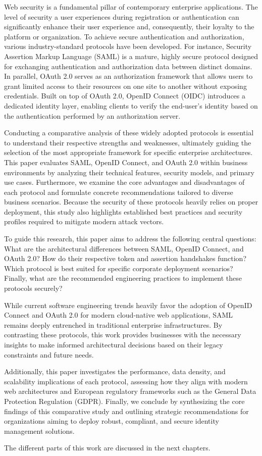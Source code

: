 \documentclass[../memoire.tex]{subfiles}
\begin{document}
Web security is a fundamental pillar of contemporary enterprise applications. The level of security a user experiences during registration or authentication can significantly enhance their user experience and, consequently, their loyalty to the platform or organization. To achieve secure authentication and authorization, various industry-standard protocols have been developed. For instance, Security Assertion Markup Language (SAML) is a mature, highly secure protocol designed for exchanging authentication and authorization data between distinct domains. In parallel, OAuth 2.0 serves as an authorization framework that allows users to grant limited access to their resources on one site to another without exposing credentials. Built on top of OAuth 2.0, OpenID Connect (OIDC) introduces a dedicated identity layer, enabling clients to verify the end-user's identity based on the authentication performed by an authorization server.

Conducting a comparative analysis of these widely adopted protocols is essential to understand their respective strengths and weaknesses, ultimately guiding the selection of the most appropriate framework for specific enterprise architectures. This paper evaluates SAML, OpenID Connect, and OAuth 2.0 within business environments by analyzing their technical features, security models, and primary use cases. Furthermore, we examine the core advantages and disadvantages of each protocol and formulate concrete recommendations tailored to diverse business scenarios. Because the security of these protocols heavily relies on proper deployment, this study also highlights established best practices and security profiles required to mitigate modern attack vectors.

To guide this research, this paper aims to address the following central questions: What are the architectural differences between SAML, OpenID Connect, and OAuth 2.0? How do their respective token and assertion handshakes function? Which protocol is best suited for specific corporate deployment scenarios? Finally, what are the recommended engineering practices to implement these protocols securely?

While current software engineering trends heavily favor the adoption of OpenID Connect and OAuth 2.0 for modern cloud-native web applications, SAML remains deeply entrenched in traditional enterprise infrastructures. By contrasting these protocols, this work provides businesses with the necessary insights to make informed architectural decisions based on their legacy constraints and future needs.

Additionally, this paper investigates the performance, data density, and scalability implications of each protocol, assessing how they align with modern web architectures and European regulatory frameworks such as the General Data Protection Regulation (GDPR). Finally, we conclude by synthesizing the core findings of this comparative study and outlining strategic recommendations for organizations aiming to deploy robust, compliant, and secure identity management solutions.

The different parts of this work are discussed in the next chapters.
\end{document}
